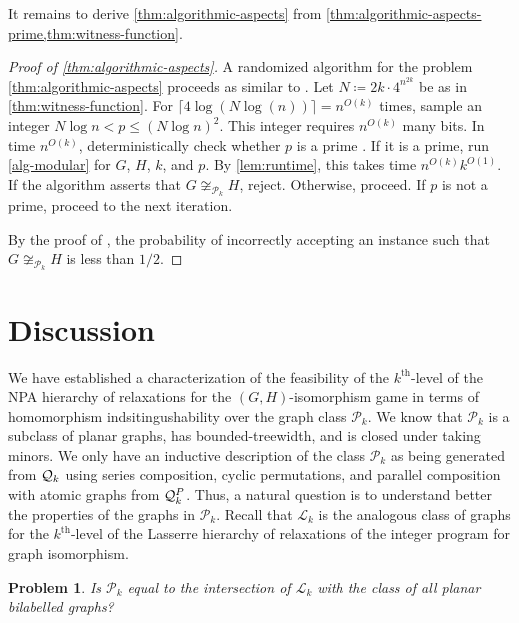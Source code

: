 \documentclass[a4paper,onecolumn,11pt,accepted=2026-01-06]{quantumarticle}
\theoremstyle{plain}
\newtheorem{prob}[thm]{Problem}
\theoremstyle{remark}
\theoremstyle{definition}
\begin{document}
It remains to derive \cref{thm:algorithmic-aspects} from \cref{thm:algorithmic-aspects-prime,thm:witness-function}. 

\begin{proof}[Proof of \cref{thm:algorithmic-aspects}]
	A randomized algorithm for the problem \cref{thm:algorithmic-aspects} proceeds as similar to \cite[Algorithm~2]{seppelt_algorithmic_2024}.
	Let $N \coloneqq 2k \cdot 4^{n^{2k}}$ be as in \cref{thm:witness-function}.
	For $\lceil 4 \log(N \log(n)) \rceil = n^{O(k)}$ times, sample an integer $N \log n < p \leq (N \log n)^2$.
	This integer requires $n^{O(k)}$ many bits.
	In time $n^{O(k)}$, deterministically check whether $p$ is a prime \cite{agrawal_primes_2004}.
	If it is a prime, run \cref{alg-modular} for $G$, $H$, $k$, and $p$.
	By \cref{lem:runtime}, this takes time $n^{O(k)}k^{O(1)}$.
	If the algorithm asserts that $G \not\cong_{\mathcal{P}_k} H$, reject.
	Otherwise, proceed.
	If $p$ is not a prime, proceed to the next iteration.

	By the proof of \cite[Theorem~1.1]{seppelt_algorithmic_2024},
	the probability of incorrectly accepting an instance such that $G \not\cong_{\mathcal{P}_k} H$ is less than $1/2$.
\end{proof}

\section{Discussion}\label{sec:conclusion}

We have established a characterization of the feasibility of the $k^{\text{th}}$-level of the NPA hierarchy of relaxations for the $(G, H)$-isomorphism game in terms of homomorphism indsitingushability over the graph class $\mathcal{P}_k$.
We know that $\mathcal{P}_k$ is a subclass of planar graphs, has bounded-treewidth, and is closed under taking minors.
We only have an inductive description of the class $\mathcal{P}_k$ as being generated from ${\mathcal Q}_k$ using series composition, cyclic permutations, and parallel composition with atomic graphs from ${\mathcal Q}_k^P$. Thus, a natural question is to understand better the properties of the graphs in $\mathcal{P}_k$.
Recall that $\mathcal{L}_k$ is the analogous class of graphs for the $k^{\text{th}}$-level of the Lasserre hierarchy of relaxations of the integer program for graph isomorphism.

\begin{prob}
  Is $\mathcal{P}_k$ equal to the intersection of $\mathcal{L}_k$ with the class of all planar bilabelled graphs?
\end{prob}
\end{document}
